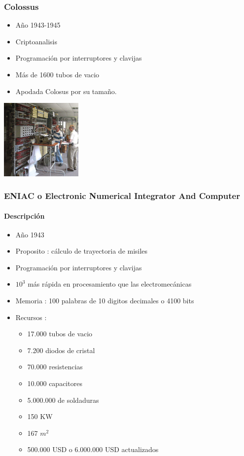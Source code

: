 \documentclass{beamer}
\begin{document}
\begin{frame}
	\frametitle{Colossus}
	\begin{minipage}[c]{7.5cm}
	\begin{itemize}
		\item Año 1943-1945
		\item Criptoanalisis
		\item Programación por interruptores y clavijas
		\item Más de 1600 tubos de vacio
		\item Apodada Colosus por su tamaño.
	\end{itemize}
	\end{minipage}
	\begin{minipage}[c]{4cm}
		\begin{center}
			\includegraphics[width=4cm]{ColossusRebuild_11.jpg}
		\end{center}
	\end{minipage}
\end{frame}

\begin{frame}
\frametitle{ENIAC o Electronic Numerical Integrator And Computer}
\framesubtitle{Descripción}
\begin{itemize}
	\item Año 1943
	\item Proposito : cálculo de trayectoria de misiles
	\item Programación por interruptores y clavijas
	\item $10^{3}$ más rápida en procesamiento que las electromecánicas
	\item Memoria : 100 palabras de 10 digitos decimales o 4100 bits
	\item Recursos :
		\begin{itemize}
			\small
			\item 17.000 tubos de vacio
			\item 7.200 diodos de cristal
			\item 70.000 resistencias
			\item 10.000 capacitores
			\item 5.000.000 de soldaduras
			\item 150 KW
			\item 167 $m^{2}$
			\item 500.000 USD o 6.000.000 USD actualizados
		\end{itemize}
	\end{itemize}
\end{frame}
\end{document}
